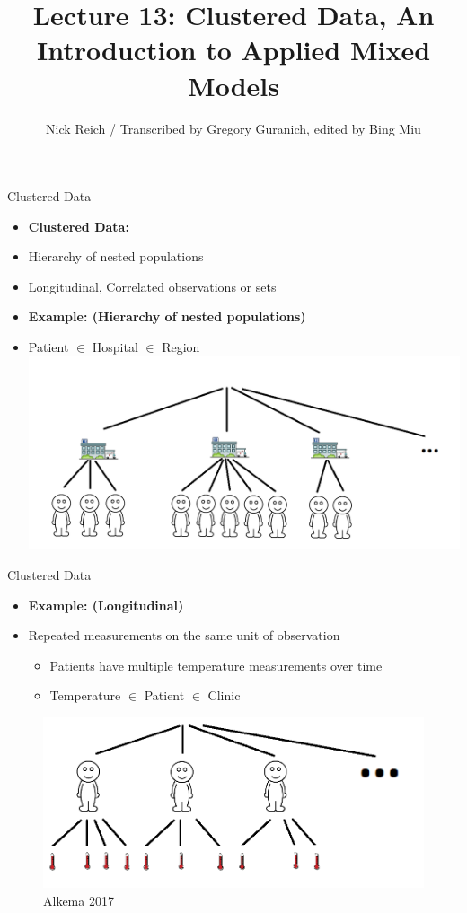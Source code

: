 \documentclass[ignorenonframetext,]{beamer}
\title{Lecture 13: Clustered Data, An Introduction to Applied Mixed Models}
\author{Nick Reich / Transcribed by Gregory Guranich, edited by Bing Miu}
\date{}
\providecommand{\tightlist}{%
  \setlength{\itemsep}{0pt}\setlength{\parskip}{0pt}}
\begin{document}
\frame{\titlepage}

\begin{frame}{Clustered Data}

\begin{itemize}
\tightlist
\item
  \textbf{Clustered Data:}\\
\item
  Hierarchy of nested populations\\
\item
  Longitudinal, Correlated observations or sets
\item
  \textbf{Example: (Hierarchy of nested populations)}\\
\item
  Patient \(\in\) Hospital \(\in\) Region \includegraphics{img1.png}
\end{itemize}

\end{frame}

\begin{frame}{Clustered Data}

\begin{itemize}
\tightlist
\item
  \textbf{Example: (Longitudinal)}
\item
  Repeated measurements on the same unit of observation

  \begin{itemize}
  \tiny
  \item Patients have multiple temperature measurements over time
  \item Temperature $\in$ Patient $\in$ Clinic
  \end{itemize}
\end{itemize}

\begin{figure}
\centering
\includegraphics{img2.png}
\caption{Alkema 2017}
\end{figure}

\end{frame}
\end{document}
